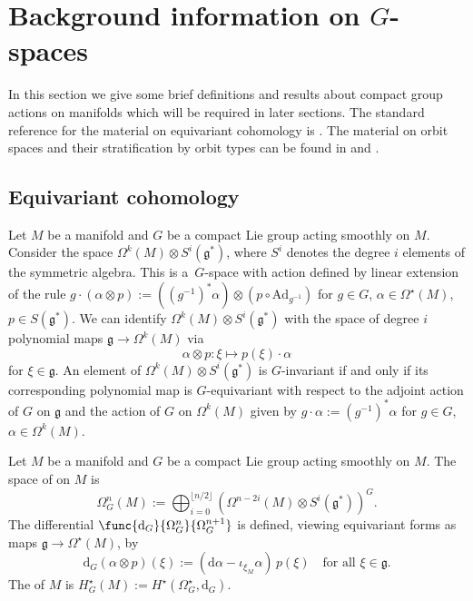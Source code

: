 \section{Background information on $G$-spaces}\label{section2}

In this section we give some brief def\/initions and results about compact group actions on manifolds which will be required in later sections.  The standard reference for the material on equivariant cohomology is \cite{supersymmetry}.  The material on orbit spaces and their stratif\/ication by orbit types can be found in \cite[Chapter 2]{duis} and \cite[Chapter 2]{ortega-ratiu}.


\subsection{Equivariant cohomology}


Let $M$ be a manifold and $G$ be a compact Lie group acting smoothly on $M$.  Consider the space $\Omega^{k}(M) \otimes S^i(\mathfrak{g}^*)$, where $S^i$ denotes the degree $i$ elements of the symmetric algebra.  This is a~$G$-space with action def\/ined by linear extension of the rule $g \cdot (\alpha \otimes p) := \left( (g^{-1})^* \alpha \right) \otimes (p \circ \mathrm{Ad}_{g^{-1}})$ for $g \in G$, $\alpha \in \Omega^{\star}(M)$, $p \in S(\mathfrak{g}^*)$.  We can identify $\Omega^{k}(M) \otimes S^i(\mathfrak{g}^*)$ with the space of degree $i$ polynomial maps $\mathfrak{g} \to \Omega^k(M)$ via
\[
  \alpha \otimes p \colon \xi \mapsto p(\xi) \cdot \alpha
\]
for $\xi \in \mathfrak{g}$.  An element of $\Omega^{k}(M) \otimes S^i(\mathfrak{g}^*)$ is $G$-invariant if and only if its corresponding polynomial map is $G$-equivariant with respect to the adjoint action of $G$ on $\mathfrak{g}$ and the action of $G$ on $\Omega^k(M)$ given by $g \cdot \alpha := (g^{-1})^* \alpha$ for $g \in G$, $\alpha \in \Omega^k(M)$.


\begin{Definition}
Let $M$ be a manifold and $G$ be a compact Lie group acting smoothly on $M$.  The space of  on $M$ is
\[
  \Omega_G^n(M) := \bigoplus_{i=0}^{\lfloor n/2 \rfloor}
  \left( \Omega^{n-2i}(M) \otimes S^i(\mathfrak{g}^*) \right)^G.
\]
The dif\/ferential $\func{\mathrm{d}_G}{\Omega_G^n}{\Omega_G^{n+1}}$ is def\/ined, viewing equivariant forms as maps $\mathfrak{g} \to \Omega^{\star}(M)$, by
\[
  \mathrm{d}_G ( \alpha \otimes p )(\xi)
  :=
  \left( \mathrm{d} \alpha - \iota_{\xi_M} \alpha \right) \, p(\xi)
  \quad \text{for all } \xi \in \mathfrak{g}.
\]
The  of $M$ is $H_G^{\star}(M) := H^{\star} (\Omega_G^{\star}, \mathrm{d}_G)$.
\end{Definition}


